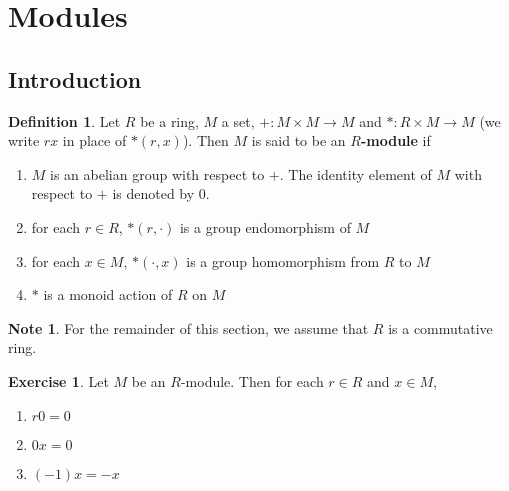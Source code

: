 \documentclass[12pt]{amsart}
\theoremstyle{definition}
\newtheorem{defn}[definition]{Definition}
\newtheorem{note}[definition]{Note}
\newtheorem{ex}[definition]{Exercise}
\begin{document}
	
	
	
	
	
	
	
	
	
	
	
	
	
	
	
	
	
	
	
	
	
	
	\newpage	
	\section{Modules}
	
	\subsection{Introduction}
	
	\begin{defn}
	Let $R$ be a ring, $M$ a set, $+: M\times M \rightarrow M$ and $*: R 
	\times M \rightarrow M$ (we write $rx$ in place of 
	$*(r,x)$). Then $M$ is said to be an 
	\textbf{$R$-module}
	if 
	\begin{enumerate}
	\item $M$ is an abelian group with respect to $+$. The identity element of $M$ with respect to $+$ is denoted by 0.
	\item for each $r \in R$, $*(r, \cdot)$ is a group endomorphism of $M$
	\item for each $x \in M$, $*(\cdot, x)$ is a group homomorphism from $R$ to $M$
	\item $*$ is a monoid action of $R$ on $M$
	\end{enumerate}
	\end{defn}
	
	\begin{note}
	For the remainder of this section, we assume that $R$ is a commutative ring. 
	\end{note}
	
	\begin{ex}
	Let $M$ be an $R$-module. Then for each $r \in R$ and $x \in M$, 
	\begin{enumerate}
	\item $r0 = 0$
	\item $0x = 0$
	\item $(-1)x = -x$
	\end{enumerate}
	\end{ex}
	
\end{document}
